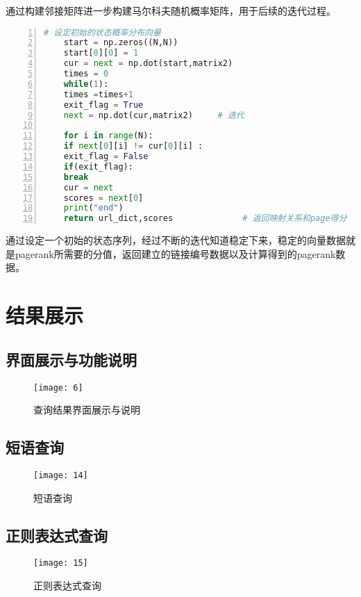 \documentclass[lang=cn,11pt]{elegantpaper}
\begin{document}
通过构建邻接矩阵进一步构建马尔科夫随机概率矩阵，用于后续的迭代过程。

\begin{lstlisting}[language = Python, numbers=left, 
numberstyle=\tiny,keywordstyle=\color{blue!70},
commentstyle=\color{red!50!green!50!blue!50},frame=shadowbox,
rulesepcolor=\color{red!20!green!20!blue!20},basicstyle=\ttfamily]
	# 设定初始的状态概率分布向量
	start = np.zeros((N,N))
	start[0][0] = 1
	cur = next = np.dot(start,matrix2)
	times = 0
	while(1):
	times =times+1
	exit_flag = True
	next = np.dot(cur,matrix2)     # 迭代
	
	for i in range(N):
	if next[0][i] != cur[0][i] :
	exit_flag = False
	if(exit_flag):
	break
	cur = next
	scores = next[0]
	print("end")
	return url_dict,scores              # 返回映射关系和page得分
\end{lstlisting}

通过设定一个初始的状态序列，经过不断的迭代知道稳定下来，稳定的向量数据就是pagerank所需要的分值，返回建立的链接编号数据以及计算得到的pagerank数据。

\section{结果展示}


\subsection{界面展示与功能说明}

\begin{figure}[htbp]
	\centering
	\texttt{[image: 6]}
	\caption{查询结果界面展示与说明 \label{fig:6}}
\end{figure}

\subsection{短语查询}

\begin{figure}[htbp]
	\centering
	\texttt{[image: 14]}
	\caption{短语查询 \label{fig:7}}
\end{figure}

\subsection{正则表达式查询}

\begin{figure}[htbp]
	\centering
	\texttt{[image: 15]}
	\caption{正则表达式查询 \label{fig:8}}
\end{figure}
\end{document}
